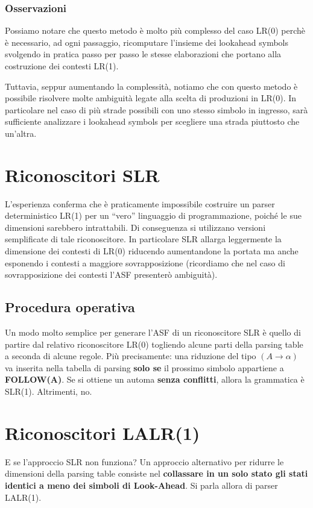 \documentclass[a4paper, fleqn]{report}
\begin{document}
\subsection{Osservazioni}
Possiamo notare che questo metodo è molto più complesso del caso LR(0) perchè è necessario, ad ogni passaggio, ricomputare l'insieme dei lookahead symbols svolgendo in pratica passo per passo le stesse elaborazioni che portano alla costruzione dei contesti LR(1).

Tuttavia, seppur aumentando la complessità, notiamo che con questo metodo è possibile risolvere molte ambiguità legate alla scelta di produzioni in LR(0).
In particolare nel caso di più strade possibili con uno stesso simbolo in ingresso, sarà sufficiente analizzare i lookahead symbols per scegliere una strada piuttosto che un'altra.

\chapter{Riconoscitori SLR}
L’esperienza conferma che è praticamente impossibile costruire un parser deterministico LR(1) per un “vero” linguaggio di programmazione, poiché le sue dimensioni sarebbero intrattabili.
Di conseguenza si utilizzano versioni semplificate di tale riconoscitore. In particolare SLR allarga leggermente la dimensione dei contesti di LR(0) riducendo aumentandone la portata ma anche esponendo i contesti a maggiore sovrapposizione (ricordiamo che nel caso di sovrapposizione dei contesti l'ASF presenterò ambiguità).

\section{Procedura operativa}
Un modo molto semplice per generare l'ASF di un riconoscitore SLR è quello di partire dal relativo riconoscitore LR(0) togliendo alcune parti della parsing table a seconda di alcune regole. Più precisamente: una riduzione del tipo
\((A \rightarrow \alpha)\) 
va inserita nella tabella di parsing \textbf{solo se} il prossimo simbolo appartiene a \textbf{FOLLOW(A)}. Se si ottiene un automa \textbf{senza conflitti}, allora la grammatica è SLR(1). Altrimenti, no.

\chapter{Riconoscitori LALR(1)}
E se l'approccio SLR non funziona?
Un approccio alternativo per ridurre le dimensioni della parsing table
consiste nel \textbf{collassare in un solo stato gli stati identici a
meno dei simboli di Look-Ahead}. Si parla allora di parser LALR(1).
\end{document}

